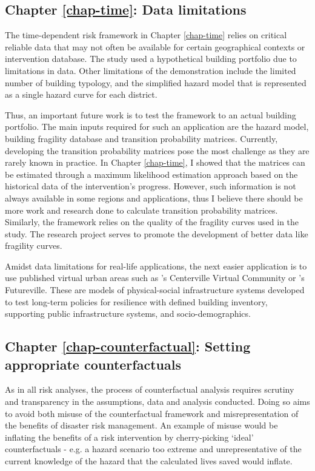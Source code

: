 \subsection{Chapter \ref{chap-time}: Data limitations}

    The time-dependent risk framework in Chapter \ref{chap-time} relies on critical reliable data that may not often be available for certain geographical contexts or intervention database. The study used a hypothetical building portfolio due to limitations in  data. Other limitations of the demonstration include the limited number of building typology, and the simplified hazard model that is represented as a single hazard curve for each district. 
    
    Thus, an important future work is to test the framework to an actual building portfolio. The main inputs required for such an application are the hazard model, building fragility database and transition probability matrices. Currently, developing the transition probability matrices pose the most challenge as they are rarely known in practice. In Chapter \ref{chap-time}, I showed that the matrices can be estimated through a maximum likelihood estimation approach based on the historical data of the intervention's progress. However, such information is not always available in some regions and applications, thus I believe there should be more work and research done to calculate transition probability matrices. Similarly, the framework relies on the quality of the fragility curves used in the study. The research project serves to promote the development of better data like fragility curves. 

    Amidst data limitations for real-life applications, the next easier application is to use published virtual urban areas such as \citet{ellingwood2016centerville}'s Centerville Virtual Community or \citet{cremen2022simulation}'s Futureville. These are models of physical-social infrastructure systems developed to test long-term policies for resilience with defined building inventory, supporting public infrastructure systems, and socio-demographics.

\subsection{Chapter \ref{chap-counterfactual}: Setting appropriate counterfactuals}

    As in all risk analyses, the process of counterfactual analysis requires scrutiny and transparency in the assumptions, data and analysis conducted. Doing so aims to avoid both misuse of the counterfactual framework and misrepresentation of the benefits of disaster risk management. An example of misuse would be inflating the benefits of a risk intervention by cherry-picking ‘ideal’ counterfactuals - e.g. a hazard scenario too extreme and unrepresentative of the current knowledge of the hazard that the calculated lives saved would inflate. 

